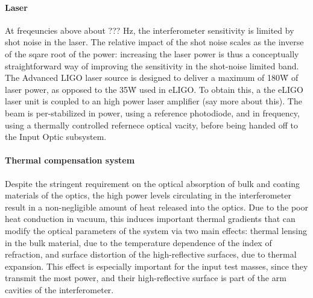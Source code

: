 
\paragraph*{Laser}
At freqeuncies above about ??? Hz, the interferometer sensitivity is limited by shot noise in the laser. The relative impact of the shot noise scales as the inverse of the sqare root of the power: increasing the laser power is thus a conceptually straightforward way of improving the sensitivity in the shot-noise limited band. The Advanced LIGO laser source is designed to deliver a maximum of 180\.W of laser power, as opposed to the 35\.W used in eLIGO. To obtain this, a the eLIGO laser unit is coupled to an high power laser amplifier (say more about this). The beam is per-stabilized in power, using a reference photodiode, and in frequency, using a thermally controlled refernece optical vacity, before being handed off to the Input Optic subsystem.

\paragraph*{Thermal compensation system}\label{sec:presfut:ground:2gen:aLIGO:TCS}
Despite the stringent requirement on the optical absorption of bulk and coating materials of the optics, the high power levels circulating in the interferometer result in a non-negligible amount of heat released into the optics. Due to the poor heat conduction in vacuum, this induces important thermal gradients that can modify the optical parameters of the system via two main effects: thermal lensing in the bulk material, due to the temperature dependence of the index of refraction, and surface distortion of the high-reflective surfaces, due to thermal expansion. This effect is especially important for the input test masses, since they transmit the most power, and their high-reflective surface is part of the arm cavities of the interferometer.

